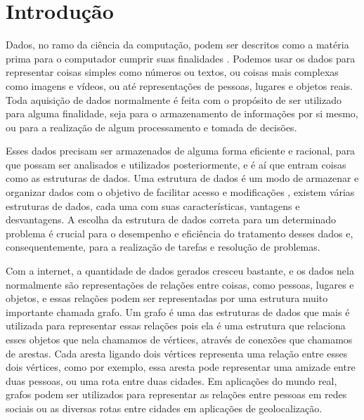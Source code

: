 \documentclass[bacharelado]{pre-projeto-computacao}
\begin{document}
\frenchspacing 
\imprimircapa
\imprimirfolhaderosto


\section*{Introdução}

Dados, no ramo da ciência da computação, podem ser descritos como a matéria prima para o computador cumprir suas finalidades \cite{cruz2014-aedi}. Podemos usar os dados para representar coisas simples como números ou textos, ou coisas mais complexas como imagens e vídeos, ou até representações de pessoas, lugares e objetos reais. Toda aquisição de dados normalmente é feita com o propósito de ser utilizado para alguma finalidade, seja para o armazenamento de informações por si mesmo, ou para a realização de algum processamento e tomada de decisões.

  Esses dados precisam ser armazenados de alguma forma eficiente e racional, para que possam ser analisados e utilizados posteriormente, e é aí que entram coisas como as estruturas de dados. Uma estrutura de dados é um modo de armazenar e organizar dados com o objetivo de facilitar acesso e modificações \cite{cormen2012-algoritmos}, existem várias estruturas de dados, cada uma com suas características, vantagens e desvantagens. A escolha da estrutura de dados correta para um determinado problema é crucial para o desempenho e eficiência do tratamento desses dados e, consequentemente, para a realização de tarefas e resolução de problemas.

  Com a internet, a quantidade de dados gerados cresceu bastante, e os dados nela normalmente são representações de relações entre coisas, como pessoas, lugares e objetos, e essas relações podem ser representadas por uma estrutura muito importante chamada grafo. Um grafo é uma das estruturas de dados que mais é utilizada para representar essas relações pois ela é uma estrutura que relaciona esses objetos que nela chamamos de vértices, através de conexões que chamamos de arestas. Cada aresta ligando dois vértices representa uma relação entre esses dois vértices, como por exemplo, essa aresta pode representar uma amizade entre duas pessoas, ou uma rota entre duas cidades. Em aplicações do mundo real, grafos podem ser utilizados para representar as relações entre pessoas em redes sociais ou as diversas rotas entre cidades em aplicações de geolocalização.
\end{document}
